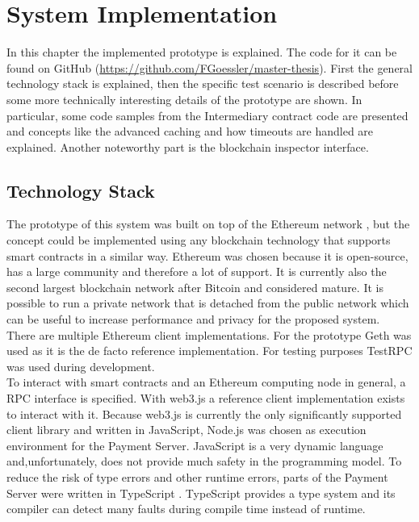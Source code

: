 \documentclass[a4paper,12pt]{scrartcl}
\begin{document}
\newpage
\section{System Implementation}

In this chapter the implemented prototype is explained. The code for it can be found on GitHub (\url{https://github.com/FGoessler/master-thesis}). First the general technology stack is explained, then the specific test scenario is described before some more technically interesting details of the prototype are shown. In particular, some code samples from the Intermediary contract code are presented and concepts like the advanced caching and how timeouts are handled are explained. Another noteworthy part is the blockchain inspector interface.

\subsection{Technology Stack}

The prototype of this system was built on top of the Ethereum network \cite{web7}, but the concept could be implemented using any blockchain technology that supports smart contracts in a similar way. Ethereum was chosen because it is open-source, has a large community and therefore a lot of support. It is currently also the second largest blockchain network after Bitcoin \cite{web22} and considered mature. It is possible to run a private network that is detached from the public network which can be useful to increase performance and privacy for the proposed system.\\
There are multiple Ethereum client implementations. For the prototype Geth \cite{web31} was used as it is the de facto reference implementation. For testing purposes TestRPC \cite{web32} was used during development.\\

To interact with smart contracts and an Ethereum computing node in general, a RPC interface \cite{web23} is specified. With web3.js \cite{web24} a reference client implementation exists to interact with it. Because web3.js is currently the only significantly supported client library and written in JavaScript, Node.js \cite{web14} was chosen as execution environment for the Payment Server. JavaScript is a very dynamic language and,unfortunately, does not provide much safety in the programming model. To reduce the risk of type errors and other runtime errors, parts of the Payment Server were written in TypeScript \cite{web25}. TypeScript provides a type system and its compiler can detect many faults during compile time instead of runtime.\\
\end{document}
